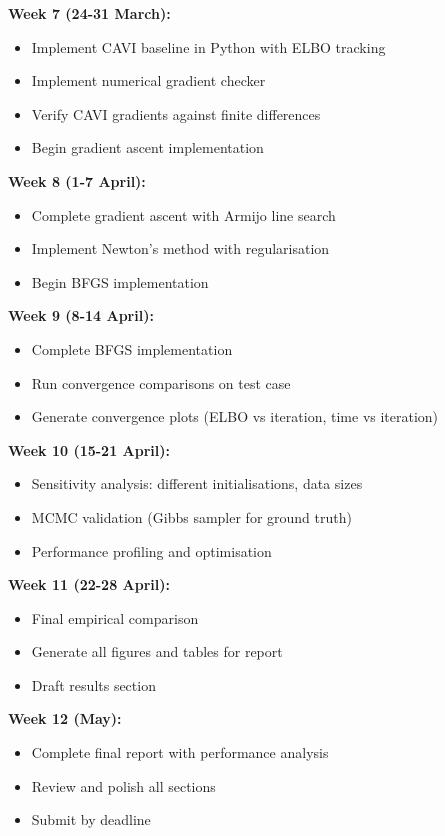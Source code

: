 \documentclass[11pt]{article}
\begin{document}
\textbf{Week 7 (24-31 March):}
\begin{itemize}
\item Implement CAVI baseline in Python with ELBO tracking
\item Implement numerical gradient checker
\item Verify CAVI gradients against finite differences
\item Begin gradient ascent implementation
\end{itemize}

\textbf{Week 8 (1-7 April):}
\begin{itemize}
\item Complete gradient ascent with Armijo line search
\item Implement Newton's method with regularisation
\item Begin BFGS implementation
\end{itemize}

\textbf{Week 9 (8-14 April):}
\begin{itemize}
\item Complete BFGS implementation
\item Run convergence comparisons on test case
\item Generate convergence plots (ELBO vs iteration, time vs iteration)
\end{itemize}

\textbf{Week 10 (15-21 April):}
\begin{itemize}
\item Sensitivity analysis: different initialisations, data sizes
\item MCMC validation (Gibbs sampler for ground truth)
\item Performance profiling and optimisation
\end{itemize}

\textbf{Week 11 (22-28 April):}
\begin{itemize}
\item Final empirical comparison
\item Generate all figures and tables for report
\item Draft results section
\end{itemize}

\textbf{Week 12 (May):}
\begin{itemize}
\item Complete final report with performance analysis
\item Review and polish all sections
\item Submit by deadline
\end{itemize}
\end{document}
